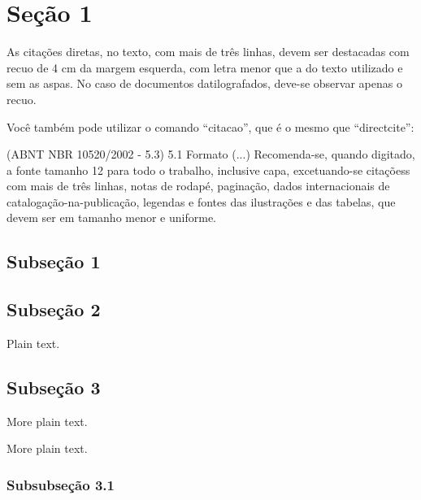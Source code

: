 \documentclass[12pt,openright,twoside,a4paper]{abntex2}
\begin{document}
\lipsum[6]


\section{Seção 1}

\lipsum[7]

\begin{directcite}
As citações diretas, no texto, com mais de três linhas, devem ser
destacadas com recuo de 4 cm da margem esquerda, com letra menor que a do texto
utilizado e sem as aspas. No caso de documentos datilografados, deve-se
observar apenas o recuo.
\end{directcite}

Você também pode utilizar o comando ``citacao'', que é o mesmo que ``directcite'':

\begin{citacao} (ABNT NBR 10520/2002 - 5.3) 5.1
Formato (...)
Recomenda-se, quando digitado, a fonte tamanho 12 para todo o trabalho,
inclusive capa, excetuando-se citaçõess com mais de três linhas, notas de
rodapé, paginação, dados internacionais de catalogação-na-publicação,
legendas e fontes das ilustrações e das tabelas, que devem ser em tamanho menor
e uniforme.
\end{citacao}

\subsection{Subseção 1}

\lipsum[8-10]

\subsection{Subseção 2}

Plain text.

\lipsum[11-15]

\subsection{Subseção 3}

More plain text.

\lipsum[16-20]

More plain text.

\subsubsection{Subsubseção 3.1}
\end{document}
